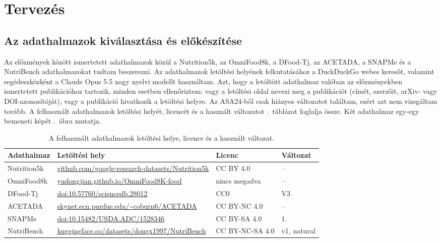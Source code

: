 \chapter{Tervezés}
\label{ch:tervezes}
\section{Az adathalmazok kiválasztása és előkészítése}
Az előzmények között ismertetett adathalmazok közül a Nutrition5k, az OmniFood8k, a DFood-Tj, az ACETADA, a SNAPMe
és a NutriBench adathalmazokat tudtam beszerezni. Az adathalmazok letöltési helyének felkutatásához a DuckDuckGo webes keresőt, 
valamint segédeszközként a Claude Opus 5.5 nagy nyelvi modellt használtam. Azt, hogy a letöltött 
adathalmaz valóban az előzményekben ismertetett publikációhoz tartozik, minden esetben ellenőriztem: 
vagy a letöltési oldal nevezi meg a publikációt (címét, szerzőit, arXiv- vagy DOI-azonosítóját), vagy 
a publikáció hivatkozik a letöltési helyre. Az ASA24-ből csak hiányos változatot találtam, ezért azt nem vizsgáltam 
tovább. A felhasznált adathalmazok letöltési helyét, licencét és a használt változatot 
\az{\ref{tab:adathalmaz_forrasok}}.~táblázat foglalja össze. Két adathalmaz egy-egy bemeneti képét \az{\ref{fig:mintakepek}}.~ábra mutatja.

\begin{table}[htbp]
\centering
\footnotesize
\caption{A felhasznált adathalmazok letöltési helye, licence és a használt változat.}
\label{tab:adathalmaz_forrasok}
\setlength{\tabcolsep}{5pt}
\begin{tabular}{l>{\raggedright\arraybackslash}p{7.2cm}ll}
\hline
Adathalmaz & Letöltési hely & Licenc & Változat \\
\hline
Nutrition5k & \href{https://github.com/google-research-datasets/Nutrition5k}{github.com/google-research-datasets/Nutrition5k} & CC BY 4.0 & -- \\
OmniFood8k  & \href{https://yudongjian.github.io/OmniFood8K-food/}{yudongjian.github.io/OmniFood8K-food} & nincs megadva & -- \\
DFood-Tj    & \href{https://doi.org/10.57760/sciencedb.28012}{doi:10.57760/sciencedb.28012} & CC0 & V3 \\
ACETADA     & \href{https://skynet.ecn.purdue.edu/~coburn6/ACETADA/}{skynet.ecn.purdue.edu/\textasciitilde coburn6/ACETADA} & CC BY-NC 4.0 & -- \\
SNAPMe      & \href{https://doi.org/10.15482/USDA.ADC/1528346}{doi:10.15482/USDA.ADC/1528346} & CC BY-SA 4.0 & 1. \\
NutriBench  & \href{https://huggingface.co/datasets/dongx1997/NutriBench}{huggingface.co/datasets/dongx1997/NutriBench} & CC BY-NC-SA 4.0 & v1, natural \\
\hline
\end{tabular}
\end{table}

